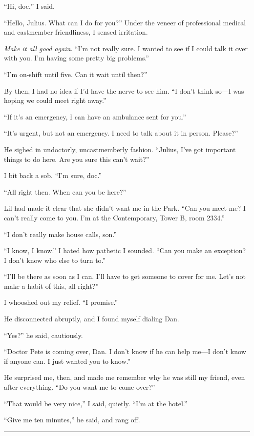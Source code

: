 “Hi, doc,” I said.

“Hello, Julius. What can I do for you?” Under the veneer of
professional medical and castmember friendliness, I sensed
irritation.

\emph{Make it all good again}. “I'm not really sure. I wanted to
see if I could talk it over with you. I'm having some pretty big
problems.”

“I'm on-shift until five. Can it wait until then?”

By then, I had no idea if I'd have the nerve to see him. “I don't
think so—I was hoping we could meet right away.”

“If it's an emergency, I can have an ambulance sent for you.”

“It's urgent, but not an emergency. I need to talk about it in
person. Please?”

He sighed in undoctorly, uncastmemberly fashion. “Julius, I've got
important things to do here. Are you sure this can't wait?”

I bit back a sob. “I'm sure, doc.”

“All right then. When can you be here?”

Lil had made it clear that she didn't want me in the Park. “Can you
meet me? I can't really come to you. I'm at the Contemporary, Tower
B, room 2334.”

“I don't really make house calls, son.”

“I know, I know.” I hated how pathetic I sounded. “Can you make an
exception? I don't know who else to turn to.”

“I'll be there as soon as I can. I'll have to get someone to cover
for me. Let's not make a habit of this, all right?”

I whooshed out my relief. “I promise.”

He disconnected abruptly, and I found myself dialing Dan.

“Yes?” he said, cautiously.

“Doctor Pete is coming over, Dan. I don't know if he can help me—I
don't know if anyone can. I just wanted you to know.”

He surprised me, then, and made me remember why he was still my
friend, even after everything. “Do you want me to come over?”

“That would be very nice,” I said, quietly. “I'm at the hotel.”

“Give me ten minutes,” he said, and rang off.

\begin{center}\rule{3in}{0.4pt}\end{center}

